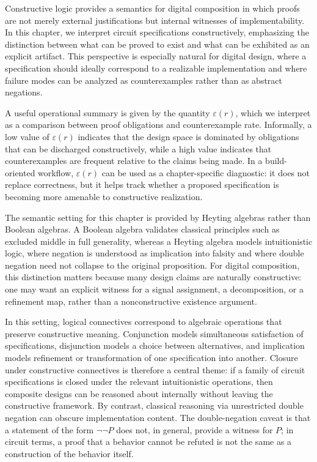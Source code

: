 Constructive logic provides a semantics for digital composition in which proofs are not merely external justifications but internal witnesses of implementability. In this chapter, we interpret circuit specifications constructively, emphasizing the distinction between what can be proved to exist and what can be exhibited as an explicit artifact. This perspective is especially natural for digital design, where a specification should ideally correspond to a realizable implementation and where failure modes can be analyzed as counterexamples rather than as abstract negations.

A useful operational summary is given by the quantity \(\varepsilon(r)\), which we interpret as a comparison between proof obligations and counterexample rate. Informally, a low value of \(\varepsilon(r)\) indicates that the design space is dominated by obligations that can be discharged constructively, while a high value indicates that counterexamples are frequent relative to the claims being made. In a build-oriented workflow, \(\varepsilon(r)\) can be used as a chapter-specific diagnostic: it does not replace correctness, but it helps track whether a proposed specification is becoming more amenable to constructive realization.

The semantic setting for this chapter is provided by Heyting algebras rather than Boolean algebras. A Boolean algebra validates classical principles such as excluded middle in full generality, whereas a Heyting algebra models intuitionistic logic, where negation is understood as implication into falsity and where double negation need not collapse to the original proposition. For digital composition, this distinction matters because many design claims are naturally constructive: one may want an explicit witness for a signal assignment, a decomposition, or a refinement map, rather than a nonconstructive existence argument.

In this setting, logical connectives correspond to algebraic operations that preserve constructive meaning. Conjunction models simultaneous satisfaction of specifications, disjunction models a choice between alternatives, and implication models refinement or transformation of one specification into another. Closure under constructive connectives is therefore a central theme: if a family of circuit specifications is closed under the relevant intuitionistic operations, then composite designs can be reasoned about internally without leaving the constructive framework. By contrast, classical reasoning via unrestricted double negation can obscure implementation content. The double-negation caveat is that a statement of the form \(\neg\neg P\) does not, in general, provide a witness for \(P\); in circuit terms, a proof that a behavior cannot be refuted is not the same as a construction of the behavior itself.

